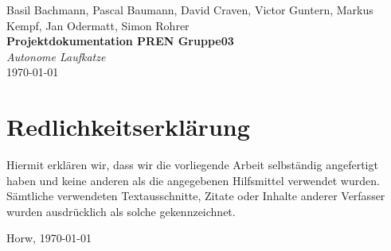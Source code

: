 \documentclass[a4paper]{report}
\newcommand*{\titleAP}{\begingroup %
	\centering
	\vspace*{\baselineskip} %

	{Basil Bachmann, Pascal Baumann, David Craven, Victor Guntern, Markus Kempf, Jan Odermatt, Simon Rohrer}\\[0.167\textheight] %

	{\Huge\bfseries Projektdokumentation PREN Gruppe03}\\[\baselineskip]

	{\Large \textit{Autonome Laufkatze}}\\
	\today

	\vspace*{3\baselineskip} %
	\endgroup}
\begin{document}

\titleAP

\newpage

\chapter*{Redlichkeitserklärung}
\label{ch*:Redlich}
Hiermit erklären wir, dass wir die vorliegende Arbeit selbständig angefertigt haben und keine anderen als die angegebenen Hilfsmittel verwendet wurden. Sämtliche verwendeten Textausschnitte, Zitate oder Inhalte anderer Verfasser wurden ausdrücklich als solche gekennzeichnet.

\vspace{1.5em}

\noindent
Horw, \today

\vspace{2em}
\end{document}
